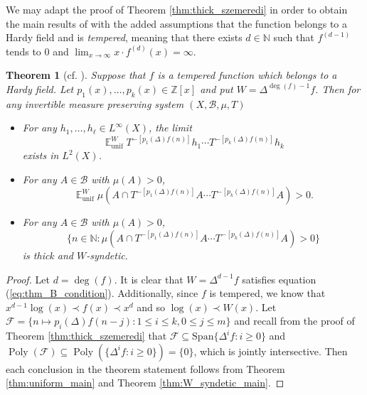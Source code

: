 \documentclass[12pt]{article}
\theoremstyle{plain} %
\newtheorem{theorem}{Theorem}[section]
\theoremstyle{definition} %
\theoremstyle{plain}
\theoremstyle{plain}
\numberwithin{equation}{section}
\newcommand{\N}{\mathbb{N}}
\newcommand{\Z}{\mathbb{Z}}
\renewcommand{\leq}{\leqslant}
\renewcommand{\geq}{\geqslant}
\renewcommand{\subset}{\subseteq}
\newcommand{\1}{\mathbbm{1}}
\newcommand{\E}{\operatorname{\mathbb{E}}}
\newcommand{\Poly}{\operatorname{Poly}}
\newcommand{\oo}{\infty}
\newcommand{\round}[1]{[ #1 ]}
\begin{document}
We may adapt the proof of Theorem \ref{thm:thick_szemeredi} in order to obtain the main results of \cite{Bergelson_Moreira_Richter_2020} with the added assumptions that the function belongs to a Hardy field and is \emph{tempered}, meaning that there exists $d\in \N$ such that $f^{(d-1)}$ tends to $0$ and $\lim_{x\to\oo}x\cdot f^{(d)}(x) = \oo$.
\begin{theorem}[cf. {\cite[Theorems A,B,D]{Bergelson_Moreira_Richter_2020}}]\label{thm:BMR_1}
    Suppose that $f$ is a tempered function which belongs to a Hardy field. Let $p_1(x),\dots, p_k(x)\in \Z[x]$ and put $W = \Delta^{\deg(f)-1}f$. Then for any invertible measure preserving system $(X,\mathscr{B},\mu,T)$
    \begin{itemize}
        \item For any $h_1,\dots, h_{\ell}\in L^{\oo}(X)$, the limit 
        \begin{equation}
            \E_{\text{unif}}^WT^{-\round{p_1(\Delta)f(n)}}h_1\cdots T^{-\round{p_k(\Delta)f(n)}}h_{k}
        \end{equation}
        exists in $L^2(X)$.
        \item For any $A\in \mathscr{B}$ with $\mu(A)>0$,
        \begin{equation}
            \E_{\text{unif}}^W
           \mu(A\cap T^{-\round{p_1(\Delta)f(n)}}A\cdots T^{-\round{p_k(\Delta)f(n)}}A)>0.
        \end{equation}
        \item For any $A\in \mathscr{B}$ with $\mu(A)>0$,
        \begin{equation}
           \{n\in \N: \mu(A\cap T^{-\round{p_1(\Delta)f(n)}}A\cdots T^{-\round{p_k(\Delta)f(n)}}A)>0\}
        \end{equation}
        is thick and $W$-syndetic.
    \end{itemize}
\end{theorem}
\begin{proof}
    Let $d = \deg(f)$. It is clear that $W=\Delta^{d
    -1}f$ satisfies equation (\ref{eq:thm_B_condition}). Additionally, since $f$ is tempered, we know that $x^{d-1}\log(x)\prec f(x)\prec x^{d}$ and so $\log(x)\prec W(x)$. 
   Let $\mathscr{F} =  \{n\mapsto p_i(\Delta)f(n-j):1\leq i\leq k, 0\leq j\leq m\}$ and recall from the proof of Theorem \ref{thm:thick_szemeredi} that $
   \mathscr{F}\subset\text{Span}\{\Delta^{i}f:i\geq 0\}$ and $\Poly( \mathscr{F})\subset \Poly(\{\Delta^{i}f:i\geq 0\}) = \{0\}$, which is jointly intersective. Then each conclusion in the theorem statement follows from Theorem \ref{thm:uniform_main} and Theorem \ref{thm:W_syndetic_main}.
\end{proof}
\end{document}
